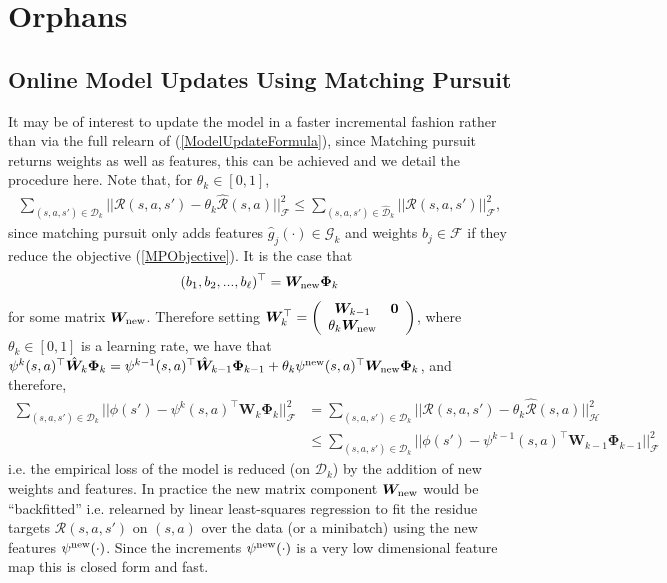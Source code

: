 \documentclass[letterpaper]{article}
\newcommand{\cD}{{\mathcal D}}
\newcommand{\cH}{{\mathcal H}}
\newcommand{\cF}{{\mathcal F}}
\newcommand{\cR}{{\mathcal R}}
\newcommand{\cG}{{\mathcal G}}
\newcommand{\bW}{{\bm W}}
\newcommand{\bPhi}{{\bm \Phi}}
\newcommand{\nn}{\nonumber}
\newcommand{\bzero }{{\bm 0}}
\begin{document}
\section{Orphans}


\subsection{Online Model Updates Using  Matching Pursuit} \label{OnlineModelUpdate}

It may be of interest to update the model in a faster incremental fashion rather than via the full relearn of (\ref{ModelUpdateFormula}), since Matching pursuit returns weights as well as features, this can be achieved and we detail the procedure here. Note that, for $\theta_k\in[0,1]$,
\begin{align}
\sum_{(s,a,s')\in\cD_k} || \cR(s,a,s') - \theta_k \hat\cR(s,a) ||^2_{\cF} \le  \sum_{(s,a,s')\in\hat\cD_k} || \cR(s,a,s') ||^2_{\cF}, \nn
\end{align}
since matching pursuit only adds features $\hat g_j(\cdot)\in\cG_k$ and weights $b_j\in\cF$ if they reduce the objective (\ref{MPObjective}). It is the case that
\begin{align}
(b_1, b_2,...,b_\ell)^\top = \bW_{\rm new} \bPhi_{k}
\end{align}
for some matrix $\bW_{\rm new}$. Therefore setting $\bW^\top_k =  \left( \begin{array}{cc}
 \bW_{k-1} &  \bzero  \\
\theta_k \bW_{\rm new} \end{array} \right)$,  where $\theta_k\in[0,1]$ is a learning rate, we have that
$\psi^k(s,a)^\top\hat\bW_k \bPhi_k =  \psi^{k-1}(s,a)^\top\hat\bW_{k-1}\bPhi_{k-1} + \theta_k \psi^{\rm new}(s,a)^\top \bW_{\rm new}\bPhi_k$, and therefore,
\begin{align}
\sum_{(s,a,s')\in\cD_k} || \phi(s') -\psi^k(s,a)^\top\bW_k \bPhi_k  ||^2_{\cF} &=\sum_{(s,a,s')\in\cD_k} || \cR(s,a,s') - \theta_k \hat\cR(s,a) ||^2_{\cH}\nn\\
&\le \sum_{(s,a,s')\in\cD_k} || \phi(s') -  \psi^{k-1}(s,a)^\top\bW_{k-1} \bPhi_{k-1}||^2_{\cF} \nn
\end{align}
i.e. the empirical loss of the model is reduced (on $\cD_k$) by the addition of new weights and features. In practice the new matrix component $\bW_{\rm new}$ would be ``backfitted'' i.e. relearned by linear least-squares regression to fit the residue targets $\cR(s,a,s')$ on $(s,a)$ over the data (or a minibatch) using the new features $\psi^{\rm new}(\cdot)$. Since the increments $\psi^{\rm new}(\cdot)$ is a very low dimensional feature map this is closed form and fast.
\end{document}
